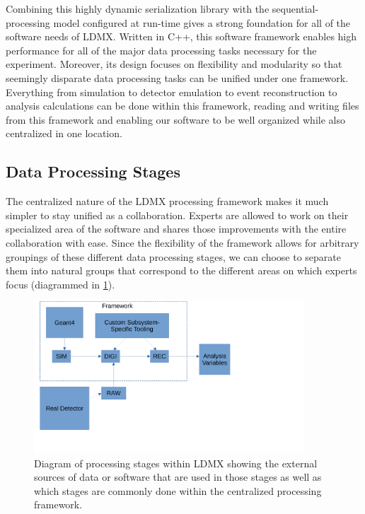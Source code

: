 Combining this highly dynamic serialization library with the sequential-processing model configured at run-time gives a strong foundation for all of the software needs of LDMX. Written in C++, this software framework enables high performance for all of the major data processing tasks necessary for the experiment. Moreover, its design focuses on flexibility and modularity so that seemingly disparate data processing tasks can be unified under one framework. Everything from simulation to detector emulation to event reconstruction to analysis calculations can be done within this framework, reading and writing files from this framework and enabling our software to be well organized while also centralized in one location.

\subsection{Data Processing Stages}
The centralized nature of the LDMX processing framework makes it much simpler to stay unified as a collaboration. Experts are allowed to work on their specialized area of the software and shares those improvements with the entire collaboration with ease. Since the flexibility of the framework allows for arbitrary groupings of these different data processing stages, we can choose to separate them into natural groups that correspond to the different areas on which experts focus (diagrammed in \cref{fig:ldmx:sim:data-stages}).

\begin{figure}
    \centering
    \includegraphics[width=0.9\textwidth]{figures/ldmx/simulation/data-flow.pdf}
    \caption{Diagram of processing stages within LDMX showing the external sources of data or software that are used in those stages as well as which stages are commonly done within the centralized processing framework.}
    \label{fig:ldmx:sim:data-stages}
\end{figure}


